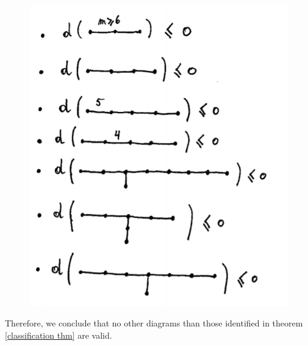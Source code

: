 \documentclass[envcountsame,envcountchap]{svmono}
\begin{document}
\begin{itemize}
\begin{figure}[h!]
\centering
\includegraphics[scale=0.6]{cours9fig7.png}
\caption{}
\label{cours9fig7}
\end{figure}    

Therefore, we conclude that no other diagrams than those identified in theorem \ref{classification thm} are valid.   




 

\end{itemize}








\mainmatter%


	
\end{document}
